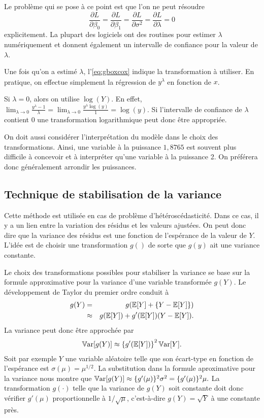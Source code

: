 Le problème qui se pose à ce point est que l'on ne peut résoudre $$\frac{\partial L}{\partial \beta_0}=\frac{\partial L}{\partial \beta_1}=\frac{\partial L}{\partial \sigma^2}=\frac{\partial L}{\partial \lambda}=0$$ explicitement. La plupart des logiciels ont des routines pour estimer $\lambda$ numériquement et donnent également un intervalle de confiance pour la valeur de $\lambda$.

Une fois qu'on a estimé $\lambda$, l'\autoref{eq:gboxcox} indique la transformation à utiliser. En pratique, on effectue simplement la régression de $y^{\hat{\lambda}}$ en fonction de $x$.

Si $\lambda = 0$, alors on utilise $\log(Y)$. En effet, $\displaystyle\lim_{\lambda\rightarrow 0}\frac{y^\lambda-1}{\lambda}=\displaystyle\lim_{\lambda\rightarrow 0}\frac{y^\lambda\log(y)}{1}=\log(y).$ Si l'intervalle de confiance de $\lambda$ contient $0$ une transformation logarithmique peut donc être appropriée.

\begin{remarque}
On doit aussi considérer l'interprétation du modèle dans le choix des transformations. Ainsi, une variable à la puissance $1,8765$ est souvent plus difficile à concevoir et à interpréter qu'une variable à la puissance 2. On préférera donc généralement arrondir les puissances.
\end{remarque}

\subsection{Technique de stabilisation de la variance}
\label{sec:Approx_var}

Cette méthode est utilisée en cas de problème d'hétéroscédasticité. Dans ce cas, il y a un lien entre la variation des résidus et les valeurs ajustées. On peut donc dire que la variance des résidus est une fonction de l'espérance de la valeur de $Y$. L'idée est de choisir une transformation $g()$ de sorte que $g(y)$ ait une variance constante.

Le choix des transformations possibles pour stabiliser la variance se base sur la formule approximative pour la variance d'une variable transformée $g(Y)$. Le développement de Taylor du premier ordre conduit à
\begin{eqnarray*}
g(Y)& = & g(\mathbb{E}[Y]+\{Y-\mathbb{E}[Y]\}) \\
& \approx  & g(\mathbb{E}[Y])+g'(\mathbb{E}[Y])(Y-\mathbb{E}[Y]).
\end{eqnarray*}
La variance peut donc être approchée par
\begin{eqnarray}
\mathbb{V}\text{ar}[g(Y)]\approx \left\{g'(\mathbb{E}[Y])\right\}^2\mathbb{V}\text{ar}[Y].
 \end{eqnarray}
 Soit par exemple $Y$ une variable aléatoire telle que son écart-type en fonction de l'espérance est $\sigma(\mu)=\mu^{1/2}$. La substitution dans la formule aproximative pour la variance nous montre que  $\mathbb{V}\text{ar}[g(Y)]\approx \{g'(\mu)\}^2\sigma^2=\{g'(\mu)\}^2\mu.$ La transformation $g(\cdot)$ telle que la variance de $g(Y)$ soit constante doit donc vérifier $g'(\mu)$ proportionnelle à $1/\sqrt{\mu}$, c'est-à-dire $g(Y)=\sqrt Y$ à une constante près.

